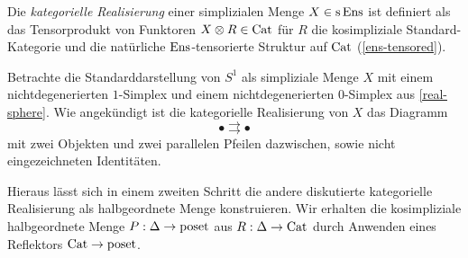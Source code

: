 \begin{defn}
  Die \emph{kategorielle Realisierung} einer simplizialen Menge $X \in
  \operatorname{s}\operatorname{Ens}$ ist definiert als das Tensorprodukt von Funktoren $X \otimes
  R \in \operatorname{Cat}$ für $R$ die kosimpliziale Standard-Kategorie und die
  natürliche $\operatorname{Ens}$-tensorierte Struktur auf $\operatorname{Cat}$
  (\ref{ens-tensored}).
\end{defn}
\begin{bsp} \label{ex:s1-diagram}
  Betrachte die Standarddarstellung von $S^1$ als simpliziale Menge
  $X$ mit einem nichtdegenerierten $1$-Simplex und einem
  nichtdegenerierten $0$-Simplex aus \ref{real-sphere}. Wie
  angekündigt ist die kategorielle Realisierung von $X$ das Diagramm
  \[ \bullet \rightrightarrows \bullet \]
  mit zwei Objekten und zwei parallelen Pfeilen dazwischen, sowie
  nicht eingezeichneten Identitäten.
\end{bsp}

Hieraus lässt sich in einem zweiten Schritt die andere diskutierte
kategorielle Realisierung als halbgeordnete Menge konstruieren. Wir
erhalten die kosimpliziale halbgeordnete Menge $P: \Delta \to \operatorname{poset}$
aus $R: \Delta \to \operatorname{Cat}$ durch Anwenden eines Reflektors $\operatorname{Cat} \to
\operatorname{poset}$.

